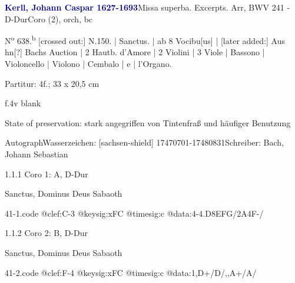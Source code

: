 \documentclass[a4paper, twocolumn, 11pt]{book}
\begin{document}
\par \vspace{16pt} \textcolor{darkblue}{\textbf{Kerll, Johann Caspar  1627-1693}}\hfillplus{[41]}\newline Missa superba. Excerpts. Arr, BWV 241 - D-Dur\newline Coro (2), orch, bc
\par \begin{itshape} N\textsuperscript{o} 638.\textsuperscript{b} [crossed out:] N.150. | Sanctus. | ab 8 Vocibu[us] | [later added:] Aus hn[?] Bachs Auction | 2 Hautb. d'Amore | 2 Violini | 3 Viole | Bassono | Violoncello | Violono | Cembalo | e | l'Organo.\end{itshape} 
\par \textcolor{darkblue}{}  Partitur: 4f.; 33 x 20,5 cm\newline \begin{small} f.4v blank\end{small} \newline \begin{small} State of preservation: stark angegriffen von Tintenfraß und häufiger Benutzung\end{small} \newline Autograph\newline Wasserzeichen: [sachsen-shield]  17470701-17480831\newline Schreiber: Bach, Johann Sebastian
\par 1.1.1  Coro 1: A, D-Dur\newline \begin{footnotesize} Sanctus, Dominus Deus Sabaoth \end{footnotesize}  
\begin{filecontents*}{41-1.code}
@clef:C-3
@keysig:xFC
@timesig:c
@data:4-4.D{8EFG}/2A4F-/
\end{filecontents*}

\newline %
\par 1.1.2  Coro 2: B, D-Dur\newline \begin{footnotesize} Sanctus, Dominus Deus Sabaoth \end{footnotesize}  
\begin{filecontents*}{41-2.code}
@clef:F-4
@keysig:xFC
@timesig:c
@data:1,D+/D/,,A+/A/
\end{filecontents*}
\end{document}
